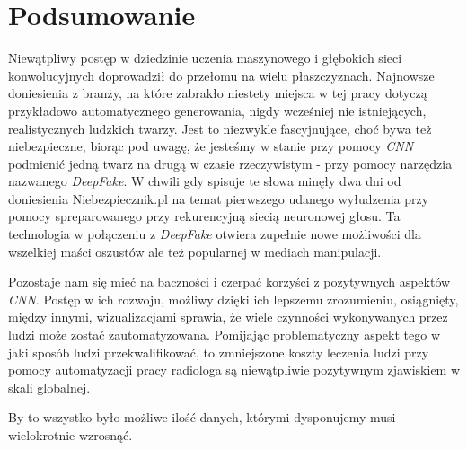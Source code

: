 \chapter{Podsumowanie}
\label{chap:summary}

Niewątpliwy postęp w dziedzinie uczenia maszynowego i głębokich sieci konwolucyjnych doprowadził do przełomu na wielu płaszczyznach. Najnowsze doniesienia z branży, na które zabrakło niestety miejsca w tej pracy dotyczą przykładowo automatycznego generowania, nigdy wcześniej nie istniejących, realistycznych ludzkich twarzy.
Jest to niezwykle fascyjnujące, choć bywa też niebezpieczne, biorąc pod uwagę, że jesteśmy w stanie przy pomocy \textit{CNN} podmienić jedną twarz na drugą w czasie rzeczywistym - przy pomocy narzędzia nazwanego \textit{DeepFake}. W chwili gdy spisuje te słowa minęły dwa dni od doniesienia Niebezpiecznik.pl na temat pierwszego udanego wyłudzenia przy pomocy spreparowanego przy rekurencyjną siecią neuronowej głosu. 
Ta technologia w połączeniu z \textit{DeepFake} otwiera zupełnie nowe możliwości dla wszelkiej maści oszustów ale też popularnej w mediach manipulacji.

Pozostaje nam się mieć na baczności i czerpać korzyści z pozytywnych aspektów \textit{CNN}. Postęp w ich rozwoju, możliwy dzięki ich lepszemu zrozumieniu, osiągnięty, między innymi, wizualizacjami sprawia, że wiele czynności wykonywanych przez ludzi może zostać zautomatyzowana.
Pomijając problematyczny aspekt tego w jaki sposób ludzi przekwalifikować, to zmniejszone koszty leczenia ludzi przy pomocy automatyzacji pracy radiologa są niewątpliwie pozytywnym zjawiskiem w skali globalnej.

By to wszystko było możliwe ilość danych, którymi dysponujemy musi wielokrotnie wzrosnąć. 
